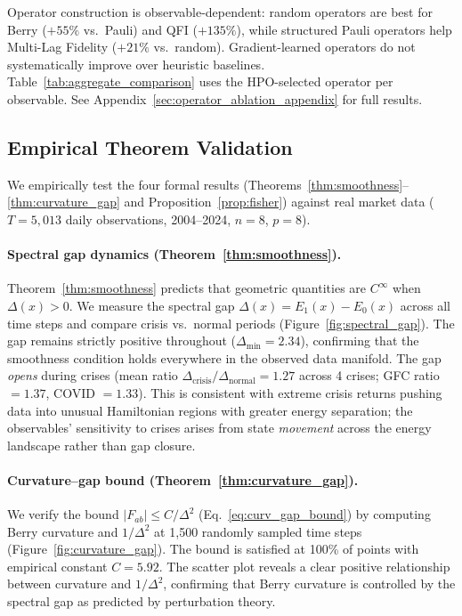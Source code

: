 \documentclass[3p]{elsarticle}
\begin{document}
Operator construction is observable-dependent: random operators are best
for Berry ($+55\%$ vs.\ Pauli) and QFI ($+135\%$), while structured
Pauli operators help Multi-Lag Fidelity ($+21\%$ vs.\ random).
Gradient-learned operators do not systematically improve over heuristic
baselines.  Table~\ref{tab:aggregate_comparison} uses the HPO-selected operator
per observable.  See Appendix~\ref{sec:operator_ablation_appendix} for
full results.

\subsection{Empirical Theorem Validation}\label{subsec:theorem_validation}

We empirically test the four formal results
(Theorems~\ref{thm:smoothness}--\ref{thm:curvature_gap} and
Proposition~\ref{prop:fisher}) against real market data ($T = 5{,}013$
daily observations, 2004--2024, $n = 8$, $p = 8$).

\paragraph{Spectral gap dynamics (Theorem~\ref{thm:smoothness}).}
Theorem~\ref{thm:smoothness} predicts that geometric quantities are
$C^\infty$ when $\Delta(x) > 0$.  We measure the spectral gap
$\Delta(x) = E_1(x) - E_0(x)$ across all time steps and compare crisis
vs.\ normal periods (Figure~\ref{fig:spectral_gap}).  The gap remains
strictly positive throughout ($\Delta_{\min} = 2.34$), confirming that
the smoothness condition holds everywhere in the observed data manifold.
The gap \emph{opens} during crises (mean ratio
$\Delta_{\text{crisis}} / \Delta_{\text{normal}} = 1.27$ across 4
crises; GFC ratio $= 1.37$, COVID $= 1.33$).  This is consistent with
extreme crisis returns pushing data into unusual Hamiltonian regions with
greater energy separation; the observables' sensitivity to crises
arises from state \emph{movement} across the energy landscape rather
than gap closure.

\paragraph{Curvature--gap bound (Theorem~\ref{thm:curvature_gap}).}
We verify the bound
$|F_{ab}| \leq C / \Delta^2$ (Eq.~\ref{eq:curv_gap_bound}) by
computing Berry curvature and $1/\Delta^2$ at 1{,}500 randomly sampled
time steps (Figure~\ref{fig:curvature_gap}).  The bound is satisfied at
100\% of points with empirical constant $C = 5.92$.  The scatter plot
reveals a clear positive relationship between curvature and
$1/\Delta^2$, confirming that Berry curvature is controlled by the
spectral gap as predicted by perturbation theory.
\end{document}
